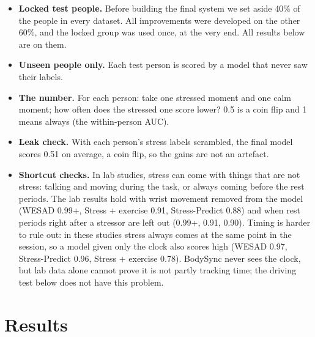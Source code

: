 \documentclass{article}
\begin{document}
\begin{itemize}
\item \textbf{Locked test people.} Before building the final system we set aside 40\% of the people in every dataset. All improvements were developed on the other 60\%, and the locked group was used once, at the very end. All results below are on them.
\item \textbf{Unseen people only.} Each test person is scored by a model that never saw their labels.
\item \textbf{The number.} For each person: take one stressed moment and one calm moment; how often does the stressed one score lower? 0.5 is a coin flip and 1 means always (the within-person AUC).
\item \textbf{Leak check.} With each person's stress labels scrambled, the final model scores 0.51 on average, a coin flip, so the gains are not an artefact.
\item \textbf{Shortcut checks.} In lab studies, stress can come with things that are not stress: talking and moving during the task, or always coming before the rest periods. The lab results hold with wrist movement removed from the model (WESAD 0.99+, Stress + exercise 0.91, Stress-Predict 0.88) and when rest periods right after a stressor are left out (0.99+, 0.91, 0.90). Timing is harder to rule out: in these studies stress always comes at the same point in the session, so a model given only the clock also scores high (WESAD 0.97, Stress-Predict 0.96, Stress + exercise 0.78). BodySync never sees the clock, but lab data alone cannot prove it is not partly tracking time; the driving test below does not have this problem.
\end{itemize}

\section{Results}
\end{document}
